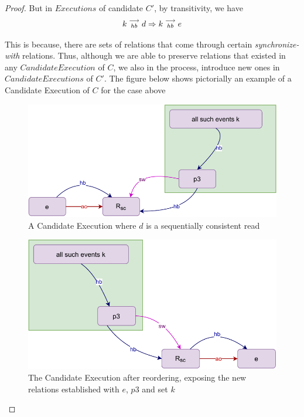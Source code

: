 \begin{proof}
        But in $Executions$ of candidate $C'$, by transitivity, we have 
        \[
            k\stackrel{\longrightarrow}{_{hb}}d \Rightarrow k\stackrel{\longrightarrow}{_{hb}}e 
        \]
        
        This is because, there are sets of relations that come through certain \textit{synchronize-with} relations. Thus, although we are able to preserve relations that existed in any $Candidate Execution$ of $C$, we also in the process, introduce new ones in $Candidate Executions$ of $C'$. The figure below shows pictorially an example of a Candidate Execution of $C$ for the case above 
        
        \begin{figure}[H]
            \centering
            \includegraphics[scale=0.7]{Q2(c).pdf}
            \caption{A Candidate Execution where $d$ is a sequentially consistent read}
            \label{fig:my_label}
        \end{figure}
        
        \begin{figure}[H]
            \centering
            \includegraphics[scale=0.7]{Q2(d).pdf}
            \caption{The Candidate Execution after reordering, exposing the new relations established with $e$, $p3$ and set $k$}
            \label{fig:my_label}
        \end{figure}
        

\end{proof}
